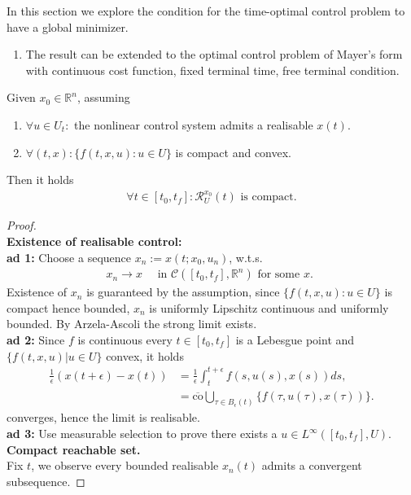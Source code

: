 In this section we explore the condition for the time-optimal control problem to have a global minimizer. 
\begin{remark}
\quad
\begin{enumerate}
	\item The result can be extended to the optimal control problem of Mayer's form with continuous cost function, fixed terminal time, free terminal condition. 
\end{enumerate}
\end{remark}


\begin{theorem}[Fillippov]
	Given $x_0 \in \mathbb{R}^n$, assuming 
	\begin{enumerate}
		\item $\forall u \in U_t:$ the nonlinear control system admits a realisable $x(t)$. 
		\item $\forall (t, x): \bigg\{f(t, x, u): u \in U \bigg\}$ is compact and convex. 
	\end{enumerate}
	Then it holds
	\begin{align*}
		\forall t \in [t_0, t_f]: \mathcal{R}_U^{x_0}(t) \text{ is compact.}
	\end{align*}
\end{theorem}
\begin{proof}
	 \quad\\
	 \textbf{Existence of realisable control:}\\
	 \textbf{ad 1:} Choose a sequence $x_n:= x(t; x_0, u_n)$, w.t.s. 
	 \begin{align*}
	 	x_n \rightarrow x \quad \text{ in } \mathcal{C}([t_0, t_f], \mathbb{R}^n) \text{ for some $x$. }
	 \end{align*} 
	 Existence of $x_n$ is guaranteed by the assumption, since $\{f(t, x, u): u \in U\}$ is compact hence bounded, $x_n$ is uniformly Lipschitz continuous and uniformly bounded. By Arzela-Ascoli the strong limit exists. \\
	 \textbf{ad 2:} Since $f$ is continuous every $t \in [t_0, t_f]$ is a Lebesgue point and $\{ f(t, x, u)|u \in U\}$ convex, it holds
	 \begin{align*}
	 	\frac{1}{\epsilon}(x(t + \epsilon) - x(t)) &= \frac{1}{\epsilon} \int_t^{t+ \epsilon} f(s, u(s), x(s)) ds, \\
	 	&= \overline{\text{co}} \bigcup_{ \tau \in  B_\epsilon(t)} \{f (\tau, u(\tau), x(\tau)) \}. 
	 \end{align*}
	 converges, hence the limit is realisable.\\
	 \textbf{ad 3:} Use measurable selection to prove there exists a $u \in L^\infty([t_0, t_f], U)$. \\
	 \textbf{Compact reachable set.}\\
	 Fix $t$, we observe every bounded realisable $x_n(t)$ admits a convergent subsequence. 
\end{proof}


